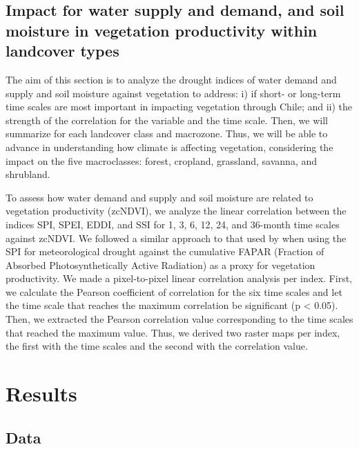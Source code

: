 \documentclass[
  authoryear,
  preprint,
  3p,
  onecolumn]{elsarticle}
\begin{document}
\hypertarget{impact-for-water-supply-and-demand-and-soil-moisture-in-vegetation-productivity-within-landcover-types}{%
\subsection{Impact for water supply and demand, and soil moisture in
vegetation productivity within landcover
types}\label{impact-for-water-supply-and-demand-and-soil-moisture-in-vegetation-productivity-within-landcover-types}}

The aim of this section is to analyze the drought indices of water
demand and supply and soil moisture against vegetation to address: i) if
short- or long-term time scales are most important in impacting
vegetation through Chile; and ii) the strength of the correlation for
the variable and the time scale. Then, we will summarize for each
landcover class and macrozone. Thus, we will be able to advance in
understanding how climate is affecting vegetation, considering the
impact on the five macroclasses: forest, cropland, grassland, savanna,
and shrubland.

To assess how water demand and supply and soil moisture are related to
vegetation productivity (zcNDVI), we analyze the linear correlation
between the indices SPI, SPEI, EDDI, and SSI for 1, 3, 6, 12, 24, and
36-month time scales against zcNDVI. We followed a similar approach to
that used by \citet{Meroni2016} when using the SPI for meteorological
drought against the cumulative FAPAR (Fraction of Absorbed
Photosynthetically Active Radiation) as a proxy for vegetation
productivity. We made a pixel-to-pixel linear correlation analysis per
index. First, we calculate the Pearson coefficient of correlation for
the six time scales and let the time scale that reaches the maximum
correlation be significant (p \textless{} 0.05). Then, we extracted the
Pearson correlation value corresponding to the time scales that reached
the maximum value. Thus, we derived two raster maps per index, the first
with the time scales and the second with the correlation value.

\hypertarget{results}{%
\section{Results}\label{results}}

\hypertarget{data-1}{%
\subsection{Data}\label{data-1}}
\end{document}
